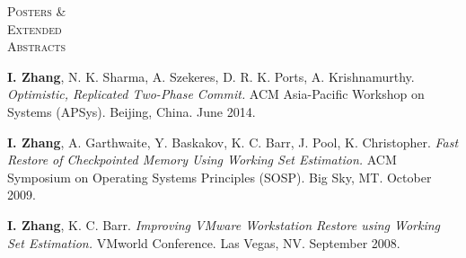 \documentclass[10pt,minionpro]{report}
\newlength{\sectiongap}
\newlength{\sectioncolwidth}
\newlength{\colgap}
\newlength{\stuffwidth}
\newenvironment{rtable}{
  \begin{minipage}{\textwidth}
  }{
  \end{minipage}
}
\newenvironment{rsection}[1]{
  \begin{minipage}[t]{\sectioncolwidth}
    \textsc{#1}
  \end{minipage}
  \hspace{\colgap}
  \begin{minipage}[t]{\stuffwidth}
  }{
    \removelastskip
  \end{minipage}
  \\[\sectiongap]
}
\begin{document}
\begin{rtable}
  \begin{rsection}{Posters \&\\Extended\\Abstracts}
    \textbf{I. Zhang}, N. K. Sharma, A. Szekeres, D. R. K. Ports,
    A. Krishnamurthy. \textit{Optimistic, Replicated Two-Phase
      Commit.}  ACM Asia-Pacific Workshop on Systems (APSys). Beijing,
    China. June 2014.\\\vspace{-.5em}

    \textbf{I. Zhang}, A. Garthwaite, Y. Baskakov, K. C. Barr, J.
    Pool, K. Christopher. \textit{Fast Restore of Checkpointed Memory
      Using Working Set Estimation.} ACM Symposium on Operating
    Systems Principles (SOSP).  Big Sky, MT. October
    2009.\\\vspace{-0.5em}

    \textbf{I. Zhang}, K. C. Barr.  \textit{Improving VMware
      Workstation Restore using Working Set Estimation.}  VMworld
    Conference. Las Vegas, NV. September 2008.\\
  \end{rsection}


\end{rtable}
\end{document}
